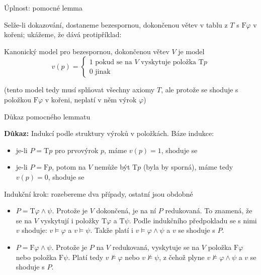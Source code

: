 \documentclass{beamer}
\begin{document}
\begin{frame}{Úplnost: pomocné lemma}

    Selže-li dokazování, dostaneme \alert{bezespornou, dokončenou} větev v tablu z $T$ s $\mathrm{F}\varphi$ v kořeni; ukážeme, že dává protipříklad:

    \pause
    \alert{Kanonický model} pro bezespornou, dokončenou větev $V$ je model
    $$
    v(p)=\begin{cases}
        1 \text{ pokud se na $V$ vyskytuje položka $\mathrm{T}p$}\\
        0 \text{ jinak}
    \end{cases}
    $$  
    
    \medskip

    \pause

    \bigskip
    
    \pause
    (tento model tedy musí splňovat všechny axiomy $T$, ale protože se shoduje s položkou $\mathrm{F}\varphi$ v kořeni, neplatí v něm výrok $\varphi$)

\end{frame}


\begin{frame}{Důkaz pomocného lemmatu}

    \textbf{Důkaz:}
    Indukcí podle struktury výroků v položkách. \pause \alert{Báze indukce:} \pause
    \begin{itemize}
        \item je-li \alert{$P=\mathrm{T}p$} pro prvovýrok $p$, máme $v(p)=1$, shoduje se\pause
        \item je-li \alert{$P=\mathrm{F}p$}, potom na $V$ nemůže být $\mathrm{T}p$ (byla by sporná), máme tedy $v(p)=0$, shoduje se\pause
    \end{itemize}

    \alert{Indukční krok:} \pause rozebereme dva případy, ostatní jsou obdobné \pause

    \begin{itemize}
        \item \alert{$P=\mathrm{T}\varphi\land\psi$}. Protože je $V$ dokončená, je na ní $P$ redukovaná. To znamená, že se na $V$ vyskytují i položky $\mathrm{T}\varphi$ a $\mathrm{T}\psi$. Podle indukčního předpokladu se s nimi $v$ shoduje: $v\models\varphi$ a $v\models\psi$. Takže platí i $v\models\varphi\land\psi$ a $v$ se shoduje s $P$.\pause
    
        \item \alert{$P=\mathrm{F}\varphi\land\psi$}. Protože je $P$ na $V$ redukovaná, vyskytuje se na $V$ položka $\mathrm{F}\varphi$ nebo položka $\mathrm{F}\psi$. Platí tedy $v\not\models\varphi$ nebo $v\not\models\psi$, z čehož plyne $v\not\models\varphi\land\psi$ a $v$ se shoduje s $P$.\hfill\qedsymbol
    \end{itemize}

\end{frame}
\end{document}
